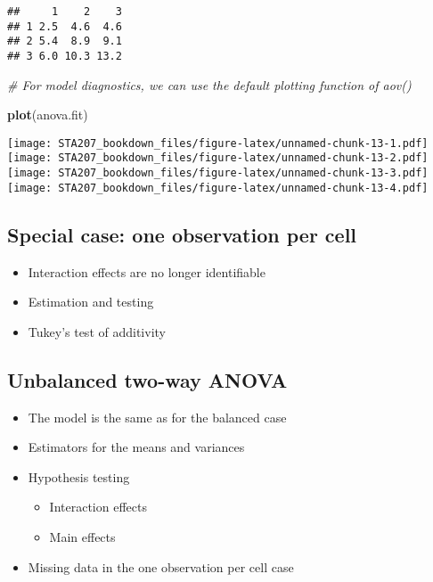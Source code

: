 \documentclass[12pt,]{book}
\newenvironment{Shaded}{\begin{snugshade}}{\end{snugshade}}
\newcommand{\KeywordTok}[1]{\textcolor[rgb]{0.13,0.29,0.53}{\textbf{#1}}}
\newcommand{\CommentTok}[1]{\textcolor[rgb]{0.56,0.35,0.01}{\textit{#1}}}
\newcommand{\NormalTok}[1]{#1}
\providecommand{\tightlist}{%
  \setlength{\itemsep}{0pt}\setlength{\parskip}{0pt}}
\begin{document}
\begin{verbatim}
##     1    2    3
## 1 2.5  4.6  4.6
## 2 5.4  8.9  9.1
## 3 6.0 10.3 13.2
\end{verbatim}

\begin{Shaded}
\begin{Highlighting}[]
\CommentTok{# For model diagnostics, we can use the default plotting function of aov()}

\KeywordTok{plot}\NormalTok{(anova.fit)}
\end{Highlighting}
\end{Shaded}

\texttt{[image: STA207\_bookdown\_files/figure-latex/unnamed-chunk-13-1.pdf]}
\texttt{[image: STA207\_bookdown\_files/figure-latex/unnamed-chunk-13-2.pdf]}
\texttt{[image: STA207\_bookdown\_files/figure-latex/unnamed-chunk-13-3.pdf]}
\texttt{[image: STA207\_bookdown\_files/figure-latex/unnamed-chunk-13-4.pdf]}

\subsection{Special case: one observation per
cell}\label{special-case-one-observation-per-cell}

\begin{itemize}
\tightlist
\item
  Interaction effects are no longer identifiable
\item
  Estimation and testing
\item
  Tukey's test of additivity
\end{itemize}

\subsection{Unbalanced two-way ANOVA}\label{unbalanced-two-way-anova}

\begin{itemize}
\tightlist
\item
  The model is the same as for the balanced case
\item
  Estimators for the means and variances
\item
  Hypothesis testing

  \begin{itemize}
  \tightlist
  \item
    Interaction effects
  \item
    Main effects
  \end{itemize}
\item
  Missing data in the one observation per cell case
\end{itemize}
\end{document}
